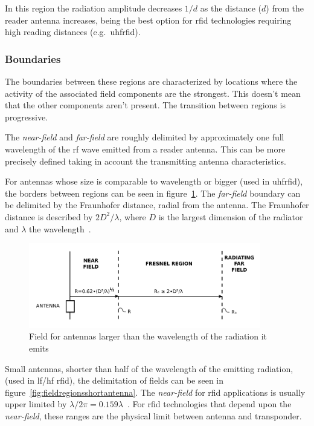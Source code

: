 In this region the radiation amplitude decreases $1/d$ as the distance ($d$) from the reader antenna increases, being the best option for \ac{rfid} technologies requiring high reading distances (e.g.\ \ac{uhfrfid}).

\subsubsection{Boundaries}

The boundaries between these regions are characterized by locations where the activity of the associated field components are the strongest. This doesn't mean that the other components aren't present. The transition between regions is progressive.

The \emph{near-field} and \emph{far-field} are roughly delimited by approximately one full wavelength of the \ac{rf} wave emitted from a reader antenna.
This can be more precisely defined taking in account the transmitting antenna characteristics.

For antennas whose size is comparable to wavelength or bigger (used in \ac{uhfrfid}), the borders between regions can be seen in figure~\ref{fig:fieldregionsbigantenna}. The \emph{far-field} boundary can be delimited by the Fraunhofer distance, radial from the antenna. The Fraunhofer distance is described by $2D^2 / \lambda$, where $D$ is the largest dimension of the radiator and $\lambda$ the wavelength~\cite{balanisAntennaTheoryAnalysis2005}.

\begin{figure}[!ht]
    \centering
    \includegraphics[width=0.9\textwidth]{./figs/02-state-of-the-art/FarNearFields-USP-4998112.pdf}
    \caption{Field for antennas larger than the wavelength of the radiation it emits~\cite{zerodamageFarFieldsVectorized1991}} 
    \label{fig:fieldregionsbigantenna}
\end{figure}

Small antennas, shorter than half of the wavelength of the emitting radiation, (used in \ac{lf}/\ac{hf} \ac{rfid}), the delimitation of fields can be seen in figure~\ref{fig:fieldregionsshortantenna}. The \emph{near-field} for \ac{rfid} applications is usually upper limited by $\lambda / 2\pi = 0.159\lambda$~\cite{nikitinOverviewFieldUHF2007a}. 
For \ac{rfid} technologies that depend upon the \emph{near-field}, these ranges are the physical limit between antenna and transponder.

